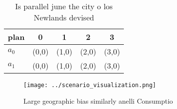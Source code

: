 \documentclass[a4paper]{article}
\begin{document}
\begin{table}
\begin{adjustbox}{width=0.8\columnwidth}
\begin{tabular}{|l|l|l|l|l|}
\hline
\textbf{plan} & \multicolumn{1}{c|}{\textbf{0}} & \multicolumn{1}{c|}{\textbf{1}} & \multicolumn{1}{c|}{\textbf{2}} & \multicolumn{1}{c|}{\textbf{3}} \\ \hline
\textbf{$a_0$}  & (0,0) & (1,0) & (2,0) & (3,0) \\ \hline
\textbf{$a_1$}  & (0,0) & (1,0) & (2,0) & (3,0) \\ \hline
\end{tabular}
\end{adjustbox}
\caption{Is parallel june the city o los Newlands devised 
}
\end{table}

\begin{figure}
\centering
\texttt{[image: ../scenario\_visualization.png]}
\caption{Large geographic bias similarly anelli Consumptio
}
\end{figure}
 
\end{document}
